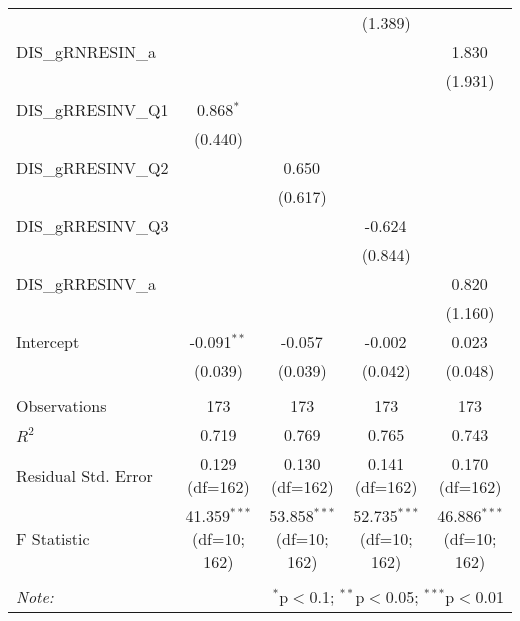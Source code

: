\begin{table}[!htbp]
\begin{tabular}{@{\extracolsep{5pt}}lcccc}
& & & (1.389) & \\
 DIS_gRNRESIN_a & & & & 1.830$^{}$ \\
& & & & (1.931) \\
 DIS_gRRESINV_Q1 & 0.868$^{*}$ & & & \\
& (0.440) & & & \\
 DIS_gRRESINV_Q2 & & 0.650$^{}$ & & \\
& & (0.617) & & \\
 DIS_gRRESINV_Q3 & & & -0.624$^{}$ & \\
& & & (0.844) & \\
 DIS_gRRESINV_a & & & & 0.820$^{}$ \\
& & & & (1.160) \\
 Intercept & -0.091$^{**}$ & -0.057$^{}$ & -0.002$^{}$ & 0.023$^{}$ \\
& (0.039) & (0.039) & (0.042) & (0.048) \\
\hline \\[-1.8ex]
 Observations & 173 & 173 & 173 & 173 \\
 $R^2$ & 0.719 & 0.769 & 0.765 & 0.743 \\
 Residual Std. Error & 0.129 (df=162) & 0.130 (df=162) & 0.141 (df=162) & 0.170 (df=162) \\
 F Statistic & 41.359$^{***}$ (df=10; 162) & 53.858$^{***}$ (df=10; 162) & 52.735$^{***}$ (df=10; 162) & 46.886$^{***}$ (df=10; 162) \\
\hline
\hline \\[-1.8ex]
\textit{Note:} & \multicolumn{4}{r}{$^{*}$p$<$0.1; $^{**}$p$<$0.05; $^{***}$p$<$0.01} \\
\end{tabular}
\end{table}